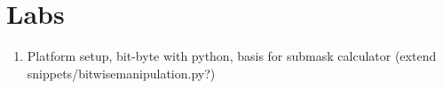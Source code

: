 \chapter{Labs}

\begin{enumerate}

\item Platform setup, bit-byte with python, basis for submask calculator (extend snippets/bitwisemanipulation.py?)


\end{enumerate}



